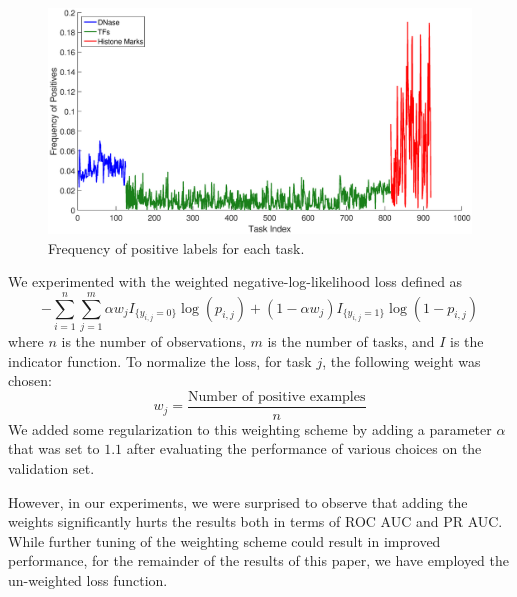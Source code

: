 \documentclass{article}
\begin{document}
\begin{figure}[h]
\begin{center}
\includegraphics[width=1\textwidth]{figures/Frequency.eps}
\caption{Frequency of positive labels for each task.}
\label{fig:frequency}
\end{center}
\end{figure}

We experimented with the weighted negative-log-likelihood loss defined as
\begin{equation} \label{eq:weightedLoss}
-\sum_{i=1}^n \sum_{j=1}^m \alpha w_j I_{\{y_{i,j} = 0\}} \log(p_{i,j}) + (1- \alpha w_j) I_{\{y_{i,j} = 1\}}\log(1 - p_{i,j})
\end{equation}
where $n$ is the number of observations, $m$ is the number of tasks, and $I$ is the indicator function. To normalize the loss, for task $j$, the following weight was chosen:
\[
w_j = \frac{\mbox{Number of positive examples}}{n}
\]
We added some regularization to this weighting scheme by adding a parameter $\alpha$ that was set to $1.1$ after evaluating the performance of various choices on the validation set.

However, in our experiments, we were surprised to observe that adding the weights significantly hurts the results both in terms of ROC AUC and PR AUC.  While further tuning of the weighting scheme could result in improved performance, for the remainder of the results of this paper, we have employed the un-weighted loss function.

\end{document}
